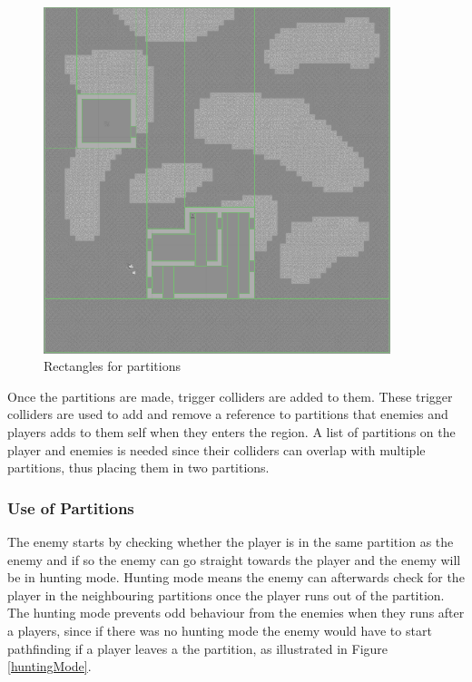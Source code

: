 \begin{figure}[H]
\begin{center}
        \includegraphics[width=0.9\textwidth]{figures/generating_levels/partition_colliders.png}
    \caption{Rectangles for partitions}\label{fig:partition_colliders_on_map}
\end{center}
\end{figure}

Once the partitions are made, trigger colliders are added to them.
These trigger colliders are used to add and remove a reference to partitions that enemies and players adds to them self when they enters the region.
A list of partitions on the player and enemies is needed since their colliders can overlap with multiple partitions, thus placing them in two partitions.

\subsubsection*{Use of Partitions}
The enemy starts by checking whether the player is in the same partition as the enemy and if so the enemy can go straight towards the player and the enemy will be in hunting mode.
Hunting mode means the enemy can afterwards check for the player in the neighbouring partitions once the player runs out of the partition.
The hunting mode prevents odd behaviour from the enemies when they runs after a players, since if there was no hunting mode the enemy would have to start pathfinding if a player leaves a the partition, as illustrated in Figure \ref{huntingMode}.

